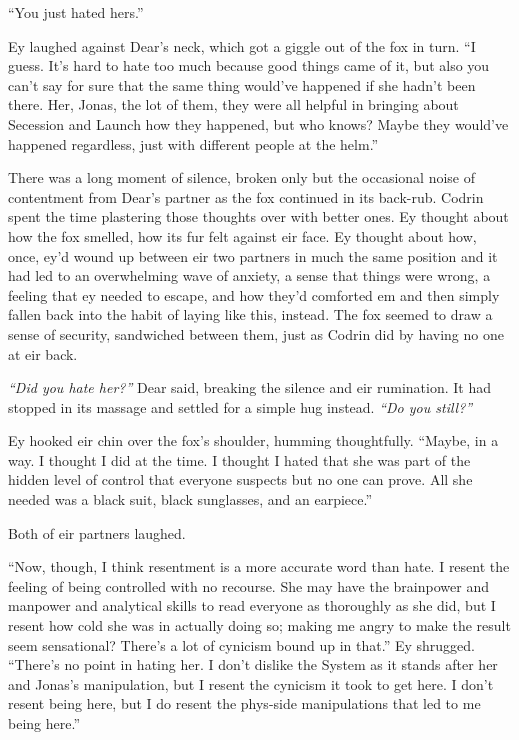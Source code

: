 ``You just hated hers.''

Ey laughed against Dear's neck, which got a giggle out of the fox in turn. ``I guess. It's hard to hate too much because good things came of it, but also you can't say for sure that the same thing would've happened if she hadn't been there. Her, Jonas, the lot of them, they were all helpful in bringing about Secession and Launch how they happened, but who knows? Maybe they would've happened regardless, just with different people at the helm.''

There was a long moment of silence, broken only but the occasional noise of contentment from Dear's partner as the fox continued in its back-rub. Codrin spent the time plastering those thoughts over with better ones. Ey thought about how the fox smelled, how its fur felt against eir face. Ey thought about how, once, ey'd wound up between eir two partners in much the same position and it had led to an overwhelming wave of anxiety, a sense that things were wrong, a feeling that ey needed to escape, and how they'd comforted em and then simply fallen back into the habit of laying like this, instead. The fox seemed to draw a sense of security, sandwiched between them, just as Codrin did by having no one at eir back.

\emph{``Did you hate her?''} Dear said, breaking the silence and eir rumination. It had stopped in its massage and settled for a simple hug instead. \emph{``Do you still?''}

Ey hooked eir chin over the fox's shoulder, humming thoughtfully. ``Maybe, in a way. I thought I did at the time. I thought I hated that she was part of the hidden level of control that everyone suspects but no one can prove. All she needed was a black suit, black sunglasses, and an earpiece.''

Both of eir partners laughed.

``Now, though, I think resentment is a more accurate word than hate. I resent the feeling of being controlled with no recourse. She may have the brainpower and manpower and analytical skills to read everyone as thoroughly as she did, but I resent how cold she was in actually doing so; making me angry to make the result seem sensational? There's a lot of cynicism bound up in that.'' Ey shrugged. ``There's no point in hating her. I don't dislike the System as it stands after her and Jonas's manipulation, but I resent the cynicism it took to get here. I don't resent being here, but I do resent the phys-side manipulations that led to me being here.''

